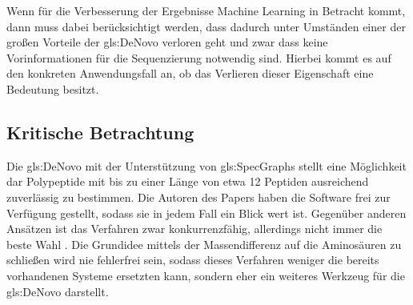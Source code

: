 \documentclass[a4paper, 12pt]{article}
\newcommand{\dashAndSpace}{\textendash \space}
\begin{document}
Wenn für die Verbesserung der Ergebnisse Machine Learning in Betracht kommt, dann muss dabei berücksichtigt werden, dass dadurch unter Umständen einer der großen Vorteile der \gls{gls:DeNovo} verloren geht \dashAndSpace und zwar dass keine Vorinformationen für die Sequenzierung notwendig sind. Hierbei kommt es auf den konkreten Anwendungsfall an, ob das Verlieren dieser Eigenschaft eine Bedeutung besitzt.

\subsection{Kritische Betrachtung}
Die \gls{gls:DeNovo} mit der Unterstützung von \glspl{gls:SpecGraph} stellt eine Möglichkeit dar Polypeptide mit bis zu einer Länge von etwa 12 Peptiden ausreichend zuverlässig zu bestimmen. Die Autoren des Papers \cite{OpenPNovo} haben die Software frei zur Verfügung gestellt, sodass sie in jedem Fall ein Blick wert ist.
Gegenüber anderen Ansätzen ist das Verfahren zwar konkurrenzfähig, allerdings nicht immer die beste Wahl \cite[650]{OpenPNovo}. Die Grundidee mittels der Massendifferenz auf die Aminosäuren zu schließen wird nie fehlerfrei sein, sodass dieses Verfahren weniger die bereits vorhandenen Systeme ersetzten kann, sondern eher ein weiteres Werkzeug für die \gls{gls:DeNovo} darstellt. 

\begingroup
\setlength{\emergencystretch}{.5em}
\printbibliography
\endgroup
 
\end{document}
